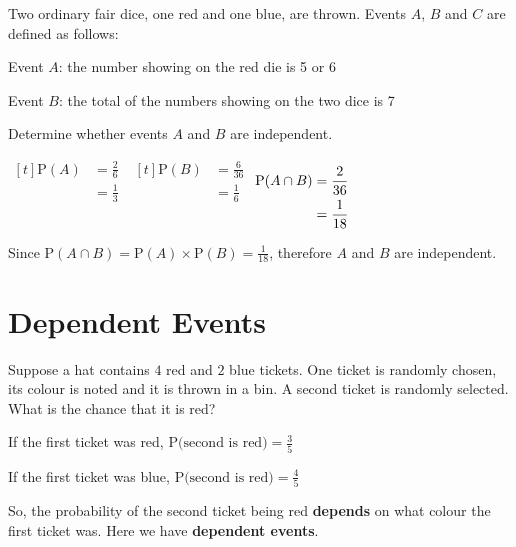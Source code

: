 \documentclass[11pt,a4paper]{book}
\begin{document}
\begin{example}

Two ordinary fair dice, one red and one blue, are thrown. Events $A$,
$B$ and $C$ are defined as follows:

Event $A$: the number showing on the red die is 5 or 6

Event $B$: the total of the numbers showing on the two dice is 7

Determine whether events $A$ and $B$ are independent.

\Solution

$
\begin{aligned}[t]
\text{P}\left(A\right) & =\frac{2}{6}\\
 & =\frac{1}{3}
\end{aligned}
$
\hspace{2cm}
$
\begin{aligned}[t]
\text{P}\left(B\right) & =\frac{6}{36}\\
 & =\frac{1}{6}
\end{aligned}
$
\hspace{2cm}
$
\begin{aligned}[t]
\text{P\ensuremath{\left(A\cap B\right)}} & =\frac{2}{36}\\
 & =\frac{1}{18}
\end{aligned}
$

Since ${\displaystyle \text{P}\left(A\cap B\right)=\text{P}\left(A\right)\times\text{P}\left(B\right)=\frac{1}{18}}$,
therefore $A$ and $B$ are independent.
\end{example}

\section{Dependent Events}

Suppose a hat contains $4$ red and $2$ blue tickets. One ticket
is randomly chosen, its colour is noted and it is thrown in a bin.
A second ticket is randomly selected. What is the chance that it is
red?

If the first ticket was red, ${\displaystyle \text{P(second is red)}=\frac{3}{5}}$

If the first ticket was blue, ${\displaystyle \text{P(second is red)}=\frac{4}{5}}$

So, the probability of the second ticket being red \textbf{depends}
on what colour the first ticket was. Here we have \textbf{dependent
events}.
\end{document}
